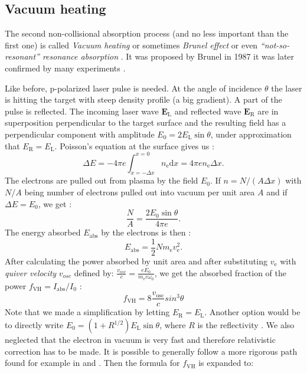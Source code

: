 \subsection*{Vacuum heating}
The second non-collisional absorption process (and no less important than the first one) is called \textit{Vacuum heating} or sometimes \textit{Brunel effect} or even \textit{“not-so-resonant” resonance absorption} \cite{brunel1987}. It was proposed by Brunel in 1987 it was later confirmed by many experiments \cite{absorption2}.

Like before, p-polarized laser pulse is needed. At the angle of incidence $\theta$ the laser is hitting the target with steep density profile (a big gradient). A part of the pulse is reflected. The incoming laser wave $\bm{E}_\mathrm{L}$ and reflected wave $\bm{E}_\mathrm{R}$ are in superposition perpendicular to the target surface and the resulting field has a perpendicular component with amplitude $E_0 =  2E_\mathrm{L}\sin\theta$, under approximation that $E_\mathrm{R}=E_\mathrm{L}$. Poisson's equation at the surface gives us \cite{absorption2}:
\begin{equation}
	\label{eq:poisson}
	\Delta E = -4\pi e\int_{x=-\Delta x}^{x=0}n_\mathrm{e} \mathrm{d}x=4\pi e n_\mathrm{e} \Delta x.
\end{equation}
The electrons are pulled out from plasma by the field $E_0$. If $n=N/\left(A\Delta x\right)$ with $N/A$ being number of electrons pulled out into vacuum per unit area $A$ and if $\Delta E = E_0$, we get \cite{absorption2}:
\begin{equation}
	\frac{N}{A} = \frac{2E_0 \sin \theta}{4\pi e}.
\end{equation}
The energy absorbed $E_{\mathrm{abs}}$ by the electrons is then \cite{absorption2}:
\begin{equation}
	E_{\mathrm{abs}} = \frac{1}{2}N m_\mathrm{e} v_{\mathrm{e}}^2.
\end{equation}
After calculating the power absorbed by unit area and after substituting $v_\mathrm{e}$ with \textit{quiver velocity} $v_{osc}$ defined by: $\frac{ v_{osc}}{c} = \frac{eE_0}{m_{\mathrm{e}}c\omega_0}$, we get the absorbed fraction of the power $f_{\mathrm{VH}} = I_{\mathrm{abs}}/I_0$ \cite{absorption2}:
\begin{equation}
	f_{\mathrm{VH}} = 8 \frac{v_{\mathrm{osc}}}{c}sin^3\theta
\end{equation}
Note that we made a simplification by letting $E_\mathrm{R}=E_\mathrm{L}$. Another option would be to directly write $E_0 =  \left(1+R^{1/2}\right)E_\mathrm{L}\sin\theta$, where $R$ is the reflectivity \cite{absorption1}. We also neglected that the electron in vacuum is very fast and therefore relativistic correction has to be made. It is possible to generally follow a more rigorous path found for example in \cite{laser-plasma5} and \cite{absorption1}. Then the formula for $f_{\mathrm{VH}}$ is expanded to:
